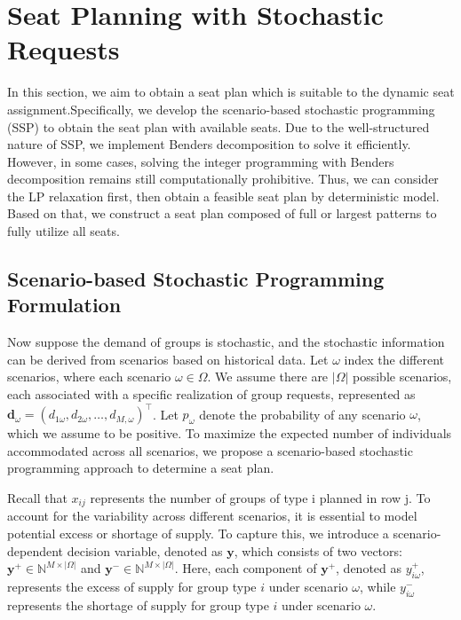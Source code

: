 

\section{Seat Planning with Stochastic Requests}\label{sec_seat_planning}
In this section, we aim to obtain a seat plan which is suitable to the dynamic seat assignment.Specifically, we develop the scenario-based stochastic programming (SSP) to obtain the seat plan with available seats. Due to the well-structured nature of SSP, we implement Benders decomposition to solve it efficiently. However, in some cases, solving the integer programming with Benders decomposition remains still computationally prohibitive. Thus, we can consider the LP relaxation first, then obtain a feasible seat plan by deterministic model. Based on that, we construct a seat plan composed of full or largest patterns to fully utilize all seats.

\subsection{Scenario-based Stochastic Programming Formulation}
Now suppose the demand of groups is stochastic, and the stochastic information can be derived from scenarios based on historical data. Let $\omega$ index the different scenarios, where each scenario $\omega \in \Omega$. We assume there are $|\Omega|$ possible scenarios, each associated with a specific realization of group requests, represented as $\mathbf{d}_\omega = (d_{1\omega},d_{2\omega},\ldots,d_{M,\omega})^{\intercal}$. Let $p_{\omega}$ denote the probability of any scenario $\omega$, which we assume to be positive. To maximize the expected number of individuals accommodated across all scenarios, we propose a scenario-based stochastic programming approach to determine a seat plan.

Recall that $x_{ij}$ represents the number of groups of type i planned in row j. To account for the variability across different scenarios, it is essential to model potential excess or shortage of supply. To capture this, we introduce a scenario-dependent decision variable, denoted as $\mathbf{y}$, which consists of two vectors: $\mathbf{y}^{+} \in \mathbb{N}^{M \times |\Omega|}$ and $\mathbf{y}^{-} \in \mathbb{N}^{M \times |\Omega|}$. Here, each component of $\mathbf{y}^{+}$, denoted as $y_{i\omega}^{+}$, represents the excess of supply for group type $i$ under scenario $\omega$, while $y_{i\omega}^{-}$ represents the shortage of supply for group type $i$ under scenario $\omega$.

